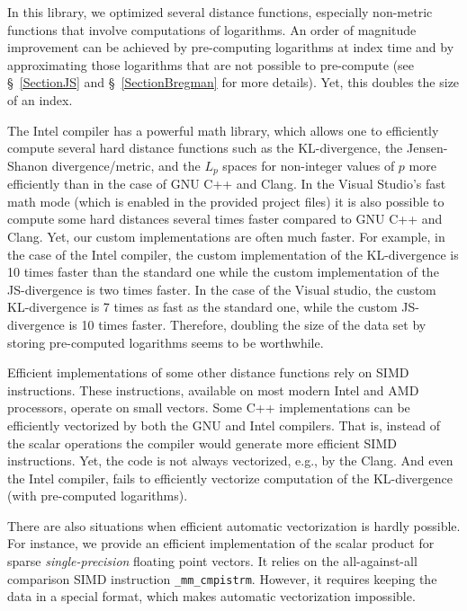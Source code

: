 \documentclass[runningheads,a4paper]{llncs}
\begin{document}
In this library, we optimized several distance functions, 
especially non-metric functions that involve computations of logarithms.
An order of magnitude improvement can be achieved by pre-computing 
logarithms at index time and by approximating those logarithms that are not possible
to pre-compute (see \S~\ref{SectionJS} and \S~\ref{SectionBregman} for more details).
Yet, this doubles the size of an index.

The Intel compiler has a powerful math library, 
which allows one to efficiently compute several hard distance functions
such as the KL-divergence, the Jensen-Shanon divergence/metric, and
the $L_p$ spaces for non-integer values of $p$ more efficiently than in the case of GNU C++
and Clang.
In the Visual Studio's fast math mode (which is enabled in the provided project files)
it is also possible to compute some hard distances several times faster compared to GNU C++ and Clang.
Yet, our custom implementations are often much faster.
For example, in the case of the Intel compiler,
the custom implementation of the KL-divergence is 10 times faster 
than the standard one while
the custom implementation of the JS-divergence is two times faster.
In the case of the Visual studio, the custom KL-divergence is 
7 times as fast as the standard one, while the custom JS-divergence is 10 times faster.
Therefore,
doubling the size of the data set by storing pre-computed logarithms seems to be worthwhile.


Efficient implementations of some other distance functions 
rely on SIMD instructions. 
These instructions, available on most modern Intel and AMD processors, 
operate on small vectors. 
Some C++ implementations can be efficiently vectorized by both the GNU and Intel compilers.
That is, instead of the scalar operations the compiler would generate
more efficient SIMD instructions.
Yet, the code is not always vectorized, e.g., by the Clang.
And even the Intel compiler, fails to efficiently vectorize 
computation of the KL-divergence (with pre-computed logarithms).

There are also situations when efficient automatic vectorization
is hardly possible. For instance,
we provide an efficient implementation of the scalar product
for sparse \emph{single-precision} floating point vectors.
It relies on the all-against-all comparison SIMD instruction \texttt{\_mm\_cmpistrm}. 
However, it requires keeping the data in a special format,
which makes automatic vectorization impossible.
\end{document}

